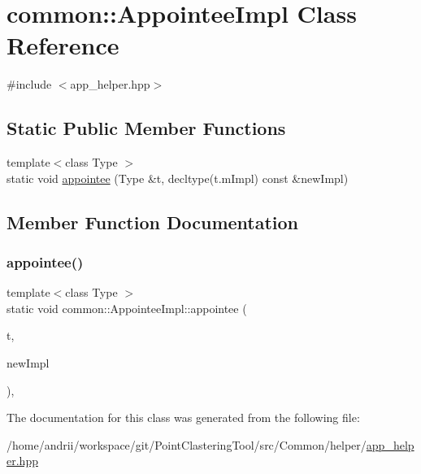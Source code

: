 \hypertarget{classcommon_1_1AppointeeImpl}{}\section{common\+:\+:Appointee\+Impl Class Reference}
\label{classcommon_1_1AppointeeImpl}


{\ttfamily \#include $<$app\+\_\+helper.\+hpp$>$}

\subsection*{Static Public Member Functions}
\begin{DoxyCompactItemize}
\item 
{\footnotesize template$<$class Type $>$ }\\static void \mbox{\hyperlink{classcommon_1_1AppointeeImpl_ae9851d8aca22816df3287ae84bab7332}{appointee}} (Type \&t, decltype(t.\+m\+Impl) const \&new\+Impl)
\end{DoxyCompactItemize}


\subsection{Member Function Documentation}
\mbox{\label{classcommon_1_1AppointeeImpl_ae9851d8aca22816df3287ae84bab7332}} 
\subsubsection{\texorpdfstring{appointee()}{appointee()}}
{\footnotesize\ttfamily template$<$class Type $>$ \\
static void common\+::\+Appointee\+Impl\+::appointee (\begin{DoxyParamCaption}\item[{Type \&}]{t,  }\item[{decltype(t.\+m\+Impl) const \&}]{new\+Impl }\end{DoxyParamCaption})\hspace{0.3cm}{\ttfamily [inline]}, {\ttfamily [static]}}



The documentation for this class was generated from the following file\+:\begin{DoxyCompactItemize}
\item 
/home/andrii/workspace/git/\+Point\+Clastering\+Tool/src/\+Common/helper/\mbox{\hyperlink{app__helper_8hpp}{app\+\_\+helper.\+hpp}}\end{DoxyCompactItemize}

